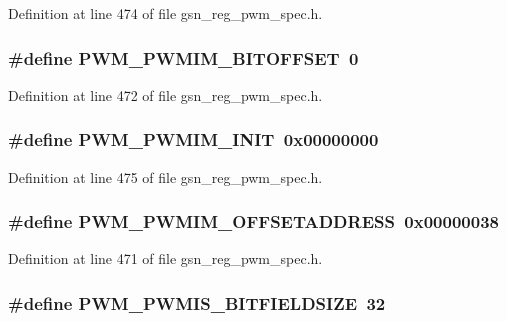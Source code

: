 Definition at line 474 of file gsn\_\-reg\_\-pwm\_\-spec.h.

\hypertarget{a00565_a8beac3873234629219bd895535763394}{
\subsubsection[{PWM\_\-PWMIM\_\-BITOFFSET}]{\setlength{\rightskip}{0pt plus 5cm}\#define PWM\_\-PWMIM\_\-BITOFFSET~0}}
\label{a00565_a8beac3873234629219bd895535763394}


Definition at line 472 of file gsn\_\-reg\_\-pwm\_\-spec.h.

\hypertarget{a00565_abfc8e4406af6d5bfb673eec20fbc3175}{
\subsubsection[{PWM\_\-PWMIM\_\-INIT}]{\setlength{\rightskip}{0pt plus 5cm}\#define PWM\_\-PWMIM\_\-INIT~0x00000000}}
\label{a00565_abfc8e4406af6d5bfb673eec20fbc3175}


Definition at line 475 of file gsn\_\-reg\_\-pwm\_\-spec.h.

\hypertarget{a00565_a469ac74ee92662446dff6988c5b5f369}{
\subsubsection[{PWM\_\-PWMIM\_\-OFFSETADDRESS}]{\setlength{\rightskip}{0pt plus 5cm}\#define PWM\_\-PWMIM\_\-OFFSETADDRESS~0x00000038}}
\label{a00565_a469ac74ee92662446dff6988c5b5f369}


Definition at line 471 of file gsn\_\-reg\_\-pwm\_\-spec.h.

\hypertarget{a00565_a9666d5eb40575f281c9569cf3dab969b}{
\subsubsection[{PWM\_\-PWMIS\_\-BITFIELDSIZE}]{\setlength{\rightskip}{0pt plus 5cm}\#define PWM\_\-PWMIS\_\-BITFIELDSIZE~32}}
\label{a00565_a9666d5eb40575f281c9569cf3dab969b}


